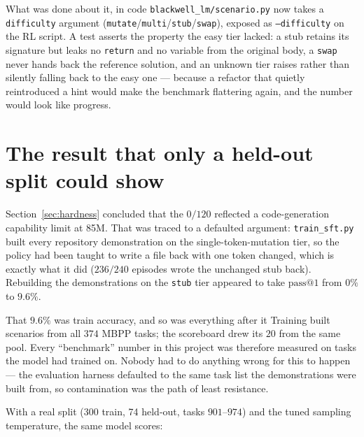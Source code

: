 \documentclass[10pt,a4paper]{article}
\newcommand{\code}[1]{\texttt{\small #1}}
\begin{document}
\begin{finding}{What was done about it, in code}
\code{blackwell\_lm/scenario.py} now takes a \code{difficulty} argument
(\code{mutate}/\code{multi}/\code{stub}/\code{swap}), exposed as
\code{--difficulty} on the RL script. A test asserts the property the easy tier
lacked: a stub retains its signature but leaks no \code{return} and no variable
from the original body, a \code{swap} never hands back the reference solution,
and an unknown tier raises rather than silently falling back to the easy one ---
because a refactor that quietly reintroduced a hint would make the benchmark
flattering again, and the number would look like progress.
\end{finding}

\section{The result that only a held-out split could show}
\label{sec:heldout}

Section~\ref{sec:hardness} concluded that the $0/120$ reflected a
code-generation capability limit at 85M. That was traced to a defaulted
argument: \code{train\_sft.py} built every repository demonstration on the
single-token-mutation tier, so the policy had been taught to write a file back
with one token changed, which is exactly what it did ($236/240$ episodes wrote
the unchanged stub back). Rebuilding the demonstrations on the \code{stub} tier
appeared to take $\mathrm{pass@}1$ from $0\%$ to $9.6\%$.

\begin{retraction}{That $9.6\%$ was train accuracy, and so was everything after it}
Training built scenarios from all $374$ MBPP tasks; the scoreboard drew its $20$
from the same pool. Every ``benchmark'' number in this project was therefore
measured on tasks the model had trained on. Nobody had to do anything wrong for
this to happen --- the evaluation harness defaulted to the same task list the
demonstrations were built from, so contamination was the path of least
resistance.
\end{retraction}

\noindent With a real split (300 train, 74 held-out, tasks $901$--$974$) and the
tuned sampling temperature, the same model scores:
\end{document}
